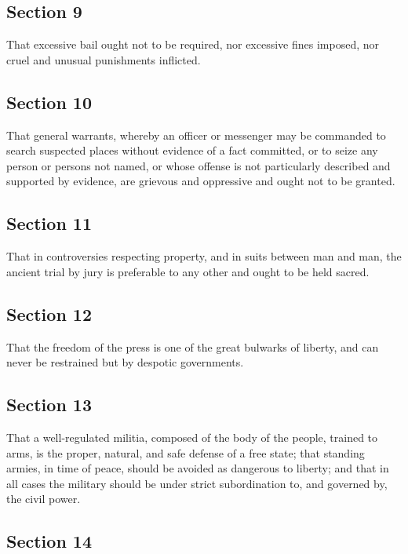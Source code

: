 \documentclass[11pt,a4paper]{article}
\begin{document}
\subsection*{Section 9}

That excessive bail ought not to be required, nor excessive fines imposed, nor cruel and unusual punishments inflicted.

\subsection*{Section 10}

That general warrants, whereby an officer or messenger may be commanded to search suspected places without evidence of a fact committed, or to seize any person or persons not named, or whose offense is not particularly described and supported by evidence, are grievous and oppressive and ought not to be granted.

\subsection*{Section 11}

That in controversies respecting property, and in suits between man and man, the ancient trial by jury is preferable to any other and ought to be held sacred.

\subsection*{Section 12}

That the freedom of the press is one of the great bulwarks of liberty, and can never be restrained but by despotic governments.

\subsection*{Section 13}

That a well-regulated militia, composed of the body of the people, trained to arms, is the proper, natural, and safe defense of a free state; that standing armies, in time of peace, should be avoided as dangerous to liberty; and that in all cases the military should be under strict subordination to, and governed by, the civil power.

\subsection*{Section 14}
\end{document}
